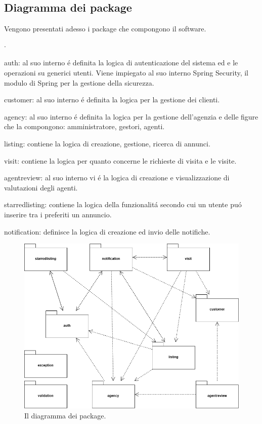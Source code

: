 \subsection{Diagramma dei package}
Vengono presentati adesso i package che compongono il software.
\begin{list}{$\cdot$}{}
    \item auth: al suo interno é definita la logica di autenticazione del sistema ed
    e le operazioni su generici utenti. Viene impiegato al suo interno Spring Security,
    il modulo di Spring per la gestione della sicurezza.
    \item customer: al suo interno é definita la logica per la gestione
    dei clienti.
    \item agency: al suo interno é definita la logica per la gestione
    dell'agenzia e delle figure che la compongono: amministratore, gestori, agenti.
    \item listing: contiene la logica di creazione, gestione, ricerca di annunci.
    \item visit: contiene la logica per quanto concerne le richieste di visita e 
    le visite.
    \item agentreview: al suo interno vi é la logica di creazione e visualizzazione di 
    valutazioni degli agenti.
    \item starredlisting: contiene la logica della funzionalitá secondo cui
    un utente puó inserire tra i preferiti un annuncio.
    \item notification: definisce la logica di creazione ed invio delle
    notifiche.
\end{list}

\begin{figure}[h]
    \centering
    \includegraphics[width=\textwidth]{assets/diagrams/class-diagram/package.png}
    \caption{Il diagramma dei package.}
    \label{fig:Diagramma dei package}
\end{figure}

